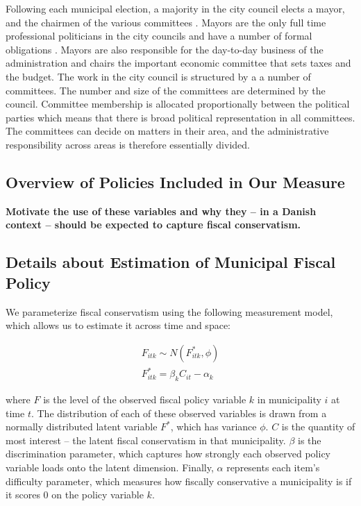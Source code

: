 \documentclass[a4paper,12pt]{article}
\begin{document}
Following each municipal election, a majority in the city council elects a mayor, and the chairmen of the various committees \citep{serritzlew2008explaining}. Mayors are the only full time professional politicians in the city councils and have a number of formal obligations \citep{kjaer2015urban}. Mayors are also responsible for the day-to-day business of the administration and chairs the important economic committee that sets taxes and the budget. The work in the city council is structured by a a number of committees. The number and size of the committees are determined by the council. Committee membership is allocated proportionally between the political parties which means that there is broad political representation in all committees. The committees can decide on matters in their area, and the administrative responsibility across areas is therefore essentially divided. 

\clearpage

\subsection{Overview of Policies Included in Our Measure} \label{policy}


\setcounter{table}{0}
\setcounter{figure}{0}

\textbf{Motivate the use of these variables and why they -- in a Danish context -- should be expected to capture fiscal conservatism.}



\clearpage

\subsection{Details about Estimation of Municipal Fiscal Policy} \label{estimation}

\setcounter{table}{0}
\setcounter{figure}{0}

We parameterize fiscal conservatism using the following measurement model, which allows us to estimate it across time and space:

\begin{gather*}
F_{itk} \sim N(F^*_{itk}, \phi)\\
F^*_{itk} = \beta_k C_{it} - \alpha_{k}
\end{gather*}

where $F$ is the level of the observed fiscal policy variable $k$ in municipality $i$ at time $t$. The distribution of each of these observed variables is drawn from a normally distributed latent variable $F^*$, which has variance $\phi$. $C$ is the quantity of most interest -- the latent fiscal conservatism in that municipality. $\beta$ is the discrimination parameter, which captures how strongly each observed policy variable loads onto the latent dimension. Finally, $\alpha$ represents each item's difficulty parameter, which measures how fiscally conservative a municipality is if it scores 0 on the policy variable $k$.
\end{document}
